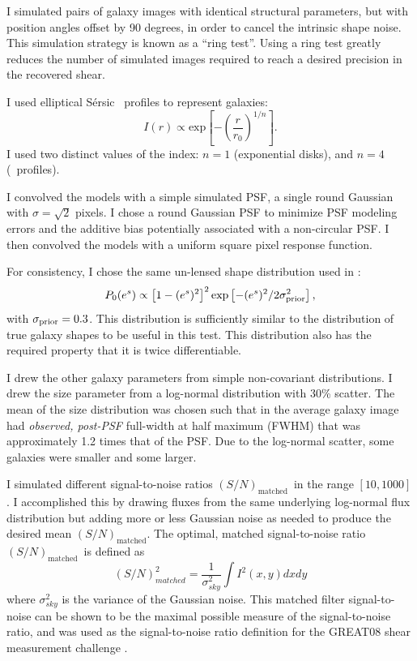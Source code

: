 \documentclass[12pt,preprint]{aastex}
\newcommand{\Msn}{$(S/N)_{\textrm{matched}}$}
\newcommand{\sersic}{S\'{e}rsic}
\newcommand{\lognormscatt}{30}
\begin{document}
I simulated pairs of galaxy images with identical structural parameters, but
with position angles offset by 90 degrees, in order to cancel the intrinsic
shape noise.  This simulation strategy is known as a ``ring
test''\citep{Nakajima2007}. Using a ring test greatly reduces the number of
simulated images required to reach a desired precision in the recovered shear.

I used elliptical \sersic\ \citep{Sersic63} profiles to represent galaxies:
\begin{equation}
I(r) \varpropto \mathrm{exp} \left[ -\left( \frac{r}{r_0} \right)^{1/n} \right].
\end{equation}
I used two distinct values of the index: $n=1$ (exponential
disks), and $n=4$ (\devauc\ profiles).

I convolved the models with a simple simulated PSF, a single round Gaussian
with $\sigma = \sqrt{2}$ pixels.  I chose a round Gaussian PSF to minimize PSF
modeling errors and the additive bias potentially associated with a
non-circular PSF.  I then convolved the models with a uniform square pixel
response function.


For consistency, I chose the same un-lensed shape distribution
used in \cite{ba14}:
\begin{equation}
P_0(e^s)\propto \left[1-(e^s)^2\right]^2 \exp\left[-(e^s)^2/2\sigma_{\rm prior}^2\right],
\end{equation}
with $\sigma_{\rm prior}=0.3$. This distribution is sufficiently similar to the
distribution of true galaxy shapes to be useful in this test.  This
distribution also has the required property that it is twice differentiable.

I drew the other galaxy parameters from simple non-covariant distributions.  I
drew the size parameter from a log-normal distribution with \lognormscatt\%
scatter.  The mean of the size distribution was chosen such that in the average
galaxy image had {\it observed, post-PSF} full-width at half maximum (FWHM)
that was approximately 1.2 times that of the PSF.  Due to the log-normal
scatter, some galaxies were smaller and some larger.

I simulated different signal-to-noise ratios \Msn\ in the range $[10,1000]$.  I
accomplished this by drawing fluxes from the same underlying log-normal flux
distribution but adding more or less Gaussian noise as needed to produce the
desired mean \Msn.  The optimal, matched signal-to-noise ratio \Msn\ is defined
as
\begin{equation}
    (S/N)^2_{matched} = \frac{1}{\sigma^2_{sky}} \int I^2(x,y) dx dy
\end{equation}
where $\sigma_{sky}^2$ is the variance of the Gaussian noise.  This matched
filter signal-to-noise can be shown to be the maximal possible measure of the
signal-to-noise ratio, and was used as the signal-to-noise ratio definition for
the GREAT08 shear measurement challenge \citep{BridleGREAT08}.
\end{document}
